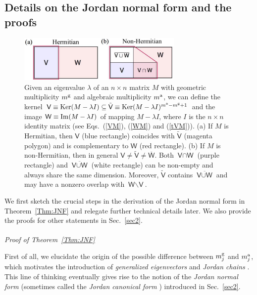 \documentclass{tADP2e}
\theoremstyle{plain}
\theoremstyle{plain}
\theoremstyle{definition}
\begin{document}
\begin{appendices}
\section{Details on the Jordan normal form and the proofs}\label{app1}
\begin{figure}[b]
\begin{center}
\includegraphics[width=8cm]{./Figures/fig_app1.pdf}
\end{center}
\caption{Given an eigenvalue $\lambda$ of an $n\times n$ matrix $M$ with geometric multiplicity $m^{\rm g}$ and algebraic multiplicity $m^{\rm a}$, we can define the kernel $\textsf{V}\equiv{\rm Ker}(M-\lambda I)\subseteq\tilde{\textsf{V}}\equiv{\rm Ker}(M-\lambda I)^{m^{\rm a}-m^{\rm g}+1}$ and the image $\textsf{W}\equiv{\rm Im}(M-\lambda I)$ of mapping $M-\lambda I$, where $I$ is the $n\times n$ identity matrix (see Eqs.~(\ref{VM}), (\ref{WM}) and (\ref{tVM})). (a) If $M$ is Hermitian, then $\textsf{V}$ (blue rectangle) coincides with $\tilde{\textsf{V}}$ (magenta polygon) and is complementary to $\textsf{W}$ (red rectangle). (b) If $M$ is non-Hermitian, then in general $\textsf{V}\neq \tilde{\textsf{V}}\neq\overline{\textsf{W}}$. Both $\textsf{V}\cap \textsf{W}$ (purple rectangle) and $\overline{\textsf{V}\cup \textsf{W}}$ (white rectangle) can be non-empty and always share the same dimension. Moreover, $\tilde{\textsf{V}}$ contains $\overline{\textsf{V}\cup \textsf{W}}$ and may have a nonzero overlap with $\textsf{W}\backslash \textsf{V}$. }
\label{fig:app1}
\end{figure}

We first sketch the crucial steps in the derivation of the Jordan normal form in Theorem~\ref{Thm:JNF} and relegate further technical details later. We also provide the proofs for other statements in Sec.~\ref{sec2}.   
\\
\\
{\it Proof of Theorem~\ref{Thm:JNF}}

\vspace{3pt}
\noindent
First of all, we elucidate the origin of the possible difference between $m^{\rm g}_j$ and $m^{\rm a}_j$, which motivates the introduction of  \emph{generalized eigenvectors} and \emph{Jordan chains} \cite{CDM00}. This line of thinking eventually gives rise to the notion of the \emph{Jordan normal form} (sometimes called the \emph{Jordan canonical form} \cite{DH09}) introduced in Sec.~\ref{sec2}. 


\end{appendices}
\end{document}
